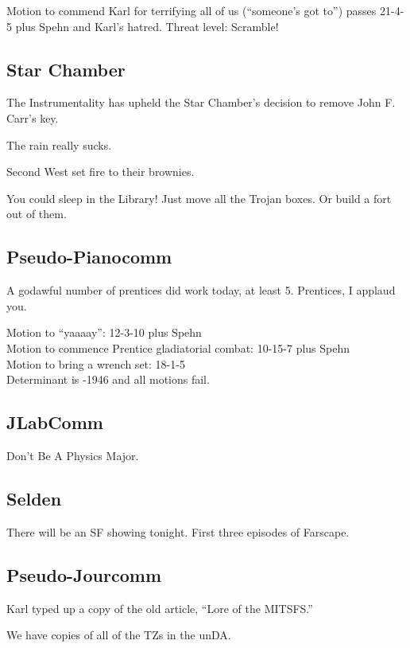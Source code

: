 \documentclass[10pt]{article}
\newcommand{\ps}{ plus Spehn\xspace}
\begin{document}
Motion to commend Karl for terrifying all of us (``someone's got to'')
passes 21-4-5 plus Spehn and Karl's hatred.  Threat level:  Scramble!

\subsection*{Star Chamber}

The Instrumentality has upheld the Star Chamber's decision to remove
John F. Carr's key.  

The rain really sucks.

Second West set fire to their brownies.

You could sleep in the Library!  Just move all the Trojan boxes.  Or
build a fort out of them.

\subsection*{Pseudo-Pianocomm}

A godawful number of prentices did work today, at least 5.  Prentices,
I applaud you.

Motion to ``yaaaay'': 12-3-10\ps \\
Motion to commence Prentice gladiatorial combat: 10-15-7 \ps  \\
Motion to bring a wrench set: 18-1-5\\

Determinant is -1946 and all motions fail.\\

\subsection*{JLabComm}

Don't Be A Physics Major. 

\subsection*{Selden}

There will be an SF showing tonight.  First three episodes of
Farscape.

\subsection*{Pseudo-Jourcomm}

Karl typed up a copy of the old article, ``Lore of the MITSFS.''

We have copies of all of the TZs in the unDA.
\end{document}
